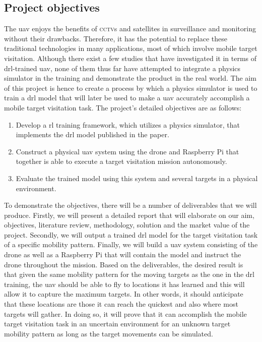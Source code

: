 \documentclass[../main.tex]{subfiles}
\begin{document}

\subsection{Project objectives}\label{sec:objectives}

The \gls{uav} enjoys the benefits of \textsc{cctv}s and satellites
in surveillance and monitoring without their drawbacks.
Therefore, it has the potential to replace these
traditional technologies in many applications, 
most of which involve mobile target visitation. 
Although there exist a few studies 
that have investigated it in terms of \gls{drl}-trained
\gls{uav},
none of them thus far have attempted to
integrate a physics simulator in the training
and demonstrate the product in the real world.
The aim of this project is hence to create a process 
by which a physics simulator is used to train 
a \gls{drl} model that will later be used
to make a \gls{uav} accurately accomplish a
mobile target visitation task.
The project's detailed objectives are as follows:

\begin{enumerate}
    \item Develop a \gls{rl} training framework,
        which utilizes a physics simulator, 
        that implements the \gls{drl} model 
        published in the \textcite{Ged21} paper.
    \item Construct a physical \gls{uav} system 
        using the \anafi drone and 
        Raspberry Pi that together is able to execute
        a target visitation mission autonomously.
    \item Evaluate the trained model using this system
        and several targets in a physical environment.
\end{enumerate}

To demonstrate the objectives, there will be a number 
of deliverables that we will produce.
Firstly, we will present a detailed report that will elaborate on our aim, objectives, literature review, methodology,
solution and the market value of the project.
Secondly, we will output a trained \gls{drl} model for 
the target visitation task of a specific
mobility pattern.
Finally, we will build a \gls{uav} system
consisting of the \anafi drone as well as a Raspberry Pi
that will contain the model and instruct
the \anafi drone throughout the mission.
Based on the deliverables, the desired result is that
given the same mobility pattern for 
the moving targets as the one in the \gls{drl} training,
the \gls{uav} should be able to fly to locations it has learned
and this will allow it to capture the maximum targets. In other words,
it should anticipate that these locations are those it can reach
the quickest and also where most targets will gather.
In doing so, it will prove that it can accomplish 
the mobile target visitation task in an uncertain environment
for an unknown target mobility pattern
as long as the target movements can be simulated.
\end{document}
